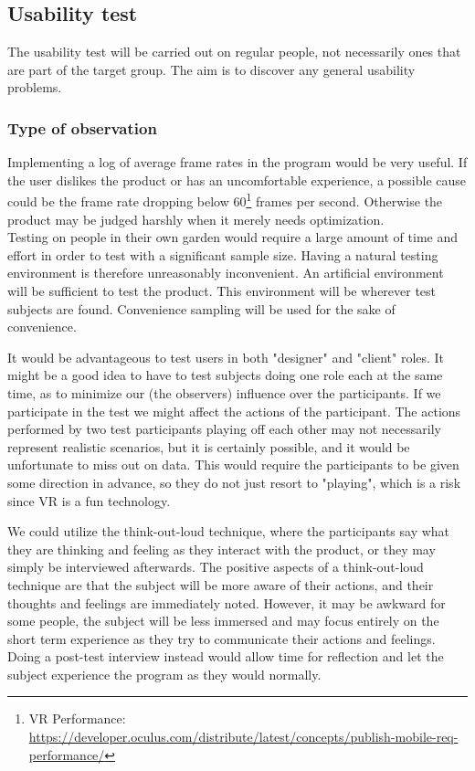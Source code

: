 \subsection{Usability test}

The usability test will be carried out on regular people, not necessarily ones that are part of the target group. The aim is to discover any general usability problems. 

\subsubsection{Type of observation}

Implementing a log of average frame rates in the program would be very useful. If the user dislikes the product or has an uncomfortable experience, a possible cause could be the frame rate dropping below 60\footnote{VR Performance: \url{https://developer.oculus.com/distribute/latest/concepts/publish-mobile-req-performance/}} frames per second. Otherwise the product may be judged harshly when it merely needs optimization.\\

Testing on people in their own garden would require a large amount of time and effort in order to test with a significant sample size. Having a natural testing environment is therefore unreasonably inconvenient. An artificial environment will be sufficient to test the product. This environment will be wherever test subjects are found. Convenience sampling will be used for the sake of convenience.

It would be advantageous to test users in both "designer" and "client" roles. It might be a good idea to have to test subjects doing one role each at the same time, as to minimize our (the observers) influence over the participants. If we participate in the test we might affect the actions of the participant. The actions performed by two test participants playing off each other may not necessarily represent realistic scenarios, but it is certainly possible, and it would be unfortunate to miss out on data. This would require the participants to be given some direction in advance, so they do not just resort to "playing", which is a risk since VR is a fun technology. 

We could utilize the think-out-loud technique, where the participants say what they are thinking and feeling as they interact with the product, or they may simply be interviewed afterwards.   
The positive aspects of a think-out-loud technique are that the subject will be more aware of their actions, and their thoughts and feelings are immediately noted. However, it may be awkward for some people, the subject will be less immersed and may focus entirely on the short term experience as they try to communicate their actions and feelings. Doing a post-test interview instead would allow time for reflection and let the subject experience the program as they would normally. 

